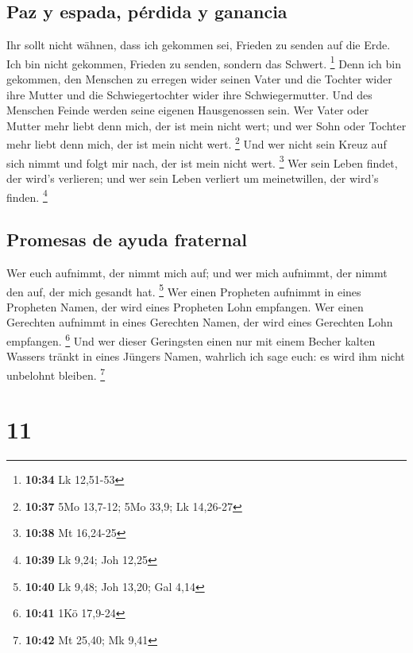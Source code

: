 \hypertarget{paz-y-espada-puxe9rdida-y-ganancia}{%
\subsection{Paz y espada, pérdida y
ganancia}\label{paz-y-espada-puxe9rdida-y-ganancia}}

 Ihr sollt nicht wähnen, dass ich gekommen sei, Frieden
zu senden auf die Erde. Ich bin nicht gekommen, Frieden zu senden,
sondern das Schwert. \footnote{\textbf{10:34} Lk 12,51-53}
 Denn ich bin gekommen, den Menschen zu erregen wider
seinen Vater und die Tochter wider ihre Mutter und die Schwiegertochter
wider ihre Schwiegermutter.  Und des Menschen Feinde
werden seine eigenen Hausgenossen sein.  Wer Vater oder
Mutter mehr liebt denn mich, der ist mein nicht wert; und wer Sohn oder
Tochter mehr liebt denn mich, der ist mein nicht wert. \footnote{\textbf{10:37}
  5Mo 13,7-12; 5Mo 33,9; Lk 14,26-27}  Und wer nicht sein
Kreuz auf sich nimmt und folgt mir nach, der ist mein nicht wert.
\footnote{\textbf{10:38} Mt 16,24-25}  Wer sein Leben
findet, der wird's verlieren; und wer sein Leben verliert um
meinetwillen, der wird's finden. \footnote{\textbf{10:39} Lk 9,24; Joh
  12,25}

\hypertarget{promesas-de-ayuda-fraternal}{%
\subsection{Promesas de ayuda
fraternal}\label{promesas-de-ayuda-fraternal}}

 Wer euch aufnimmt, der nimmt mich auf; und wer mich
aufnimmt, der nimmt den auf, der mich gesandt hat. \footnote{\textbf{10:40}
  Lk 9,48; Joh 13,20; Gal 4,14}  Wer einen Propheten
aufnimmt in eines Propheten Namen, der wird eines Propheten Lohn
empfangen. Wer einen Gerechten aufnimmt in eines Gerechten Namen, der
wird eines Gerechten Lohn empfangen. \footnote{\textbf{10:41} 1Kö
  17,9-24}  Und wer dieser Geringsten einen nur mit einem
Becher kalten Wassers tränkt in eines Jüngers Namen, wahrlich ich sage
euch: es wird ihm nicht unbelohnt bleiben. \footnote{\textbf{10:42} Mt
  25,40; Mk 9,41}

\hypertarget{section-10}{%
\section{11}\label{section-10}}

